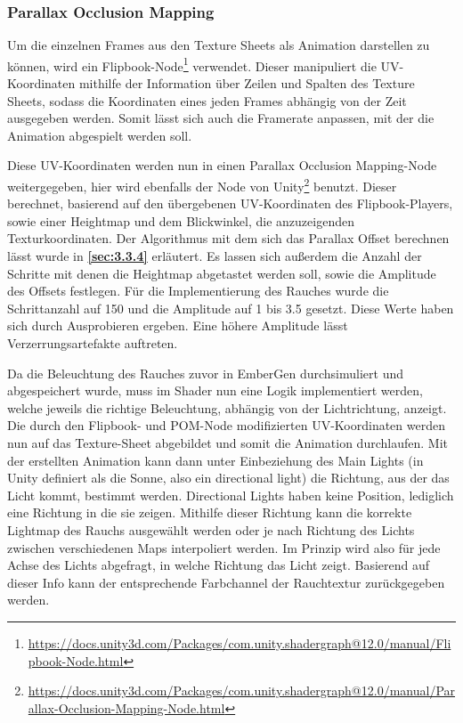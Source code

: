\subsubsection{Parallax Occlusion Mapping}

Um die einzelnen Frames aus den Texture Sheets als Animation darstellen zu können, wird ein
Flipbook-Node\footnote{\url{https://docs.unity3d.com/Packages/com.unity.shadergraph@12.0/manual/Flipbook-Node.html}}
verwendet. Dieser manipuliert die UV-Koordinaten mithilfe der Information über Zeilen und Spalten des Texture Sheets,
sodass die Koordinaten eines jeden Frames abhängig von der Zeit ausgegeben werden.
Somit lässt sich auch die Framerate anpassen, mit der die Animation abgespielt werden soll.

Diese UV-Koordinaten werden nun in einen Parallax Occlusion Mapping-Node weitergegeben, hier wird ebenfalls der Node von
Unity\footnote{\url{https://docs.unity3d.com/Packages/com.unity.shadergraph@12.0/manual/Parallax-Occlusion-Mapping-Node.html}}
benutzt. Dieser berechnet, basierend auf den übergebenen UV-Koordinaten des Flipbook-Players, sowie einer Heightmap und dem Blickwinkel, die anzuzeigenden Texturkoordinaten.
Der Algorithmus mit dem sich das Parallax Offset berechnen lässt wurde in \textbf{\autoref{sec:3.3.4}} erläutert.
Es lassen sich außerdem die Anzahl der Schritte mit denen die Heightmap abgetastet werden soll, sowie die Amplitude des Offsets festlegen.
Für die Implementierung des Rauches wurde die Schrittanzahl auf 150 und die Amplitude auf 1 bis 3.5 gesetzt. Diese Werte haben sich durch Ausprobieren ergeben.
Eine höhere Amplitude lässt Verzerrungsartefakte auftreten.


Da die Beleuchtung des Rauches zuvor in EmberGen durchsimuliert und abgespeichert wurde, muss im Shader nun eine Logik implementiert werden, welche jeweils die richtige Beleuchtung,
abhängig von der Lichtrichtung, anzeigt. Die durch den Flipbook- und POM-Node modifizierten UV-Koordinaten werden nun auf das Texture-Sheet abgebildet und somit die Animation durchlaufen.
Mit der erstellten Animation kann dann unter Einbeziehung des Main Lights (in Unity definiert als die Sonne, also ein directional light) die Richtung, aus der
das Licht kommt, bestimmt werden. Directional Lights haben keine Position, lediglich eine Richtung in die sie zeigen. Mithilfe dieser Richtung kann die korrekte Lightmap
des Rauchs ausgewählt werden oder je nach Richtung des Lichts zwischen verschiedenen Maps interpoliert werden. Im Prinzip wird also für jede Achse des Lichts abgefragt,
in welche Richtung das Licht zeigt. Basierend auf dieser Info kann der entsprechende Farbchannel der Rauchtextur zurückgegeben werden.


